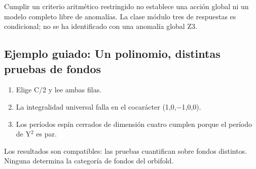 \documentclass[11pt,a4paper]{article}
\begin{document}
Cumplir un criterio aritmético restringido no establece una acción global ni un modelo completo libre de anomalías. La clase módulo tres de respuestas es condicional; no se ha identificado con una anomalía global Z3.
\subsection*{Ejemplo guiado: Un polinomio, distintas pruebas de fondos}
\begin{enumerate}
\item Elige C/2 y lee ambas filas.
\item La integralidad universal falla en el cocarácter (1,0,\ensuremath{-}1,0,0).
\item Los períodos espín cerrados de dimensión cuatro cumplen porque el período de Y\ensuremath{{}^{2}} es par.
\end{enumerate}
Los resultados son compatibles: las pruebas cuantifican sobre fondos distintos. Ninguna determina la categoría de fondos del orbifold.
\end{document}
